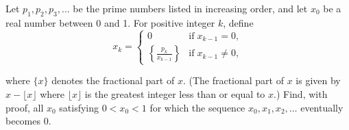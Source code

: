 Let $p_1, p_2, p_3, \ldots$ be the prime numbers listed in increasing order, and let $x_0$ be a real number between 0 and 1.  For positive integer $k$,  define\[ x_k = \begin{cases} 0 & \mbox{if} \; x_{k-1} = 0, \\[.1in] {\displaystyle \left\{ \frac{p_k}{x_{k-1}} \right\}} & \mbox{if} \; x_{k-1} \neq 0, \end{cases}  \]

where $\{x\}$ denotes the fractional part of $x$.  (The fractional part of $x$ is given by $x - \lfloor x \rfloor$ where $\lfloor x \rfloor$ is the greatest integer less than or equal to $x$.) Find, with proof, all $x_0$ satisfying $0 < x_0 < 1$ for which the sequence $x_0, x_1, x_2, \ldots$ eventually becomes 0.